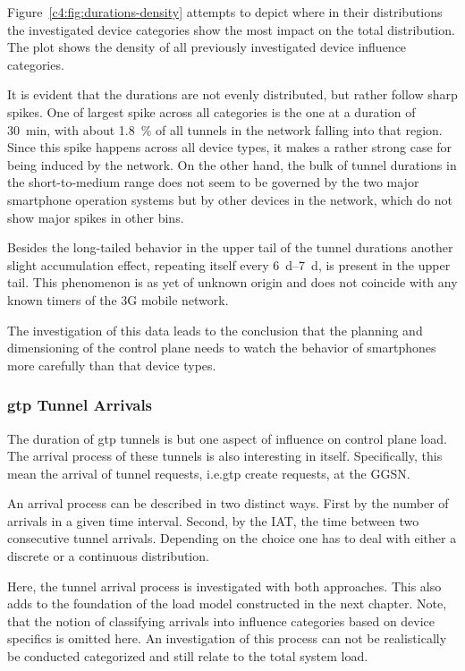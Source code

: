 Figure~\ref{c4:fig:durations-density} attempts to depict where in their distributions the investigated device categories show the most impact on the total distribution. The plot shows the density of all previously investigated device influence categories.

It is evident that the durations are not evenly distributed, but rather follow sharp spikes. One of largest spike across all categories is the one at a duration of \SI{30}{\minute}, with about \SI{1.8}{\percent} of all tunnels in the network falling into that region. Since this spike happens across all device types, it makes a rather strong case for being induced by the network. On the other hand, the bulk of tunnel durations in the short-to-medium range does not seem to be governed by the two major smartphone operation systems but by other devices in the network, which do not show major spikes in other bins.

Besides the long-tailed behavior in the upper tail of the tunnel durations another slight accumulation effect, repeating itself every \SIrange{6}{7}{\day}, is present in the upper tail. This phenomenon is as yet of unknown origin and does not coincide with any known timers of the \gls{3G} mobile network.

The investigation of this data leads to the conclusion that the planning and dimensioning of the control plane needs to watch the behavior of smartphones more carefully than that device types.


\subsubsection{\texorpdfstring{\acrshort{gtp}}{GTP} Tunnel Arrivals}

The duration of \gls{gtp} tunnels is but one aspect of influence on control plane load. The arrival process of these tunnels is also interesting in itself. Specifically, this mean the arrival of tunnel requests, i.e.\gls{gtp} create requests, at the \gls{GGSN}. 

An arrival process can be described in two distinct ways. First by the number of arrivals in a given time interval. Second, by the \gls{IAT}, the time between two consecutive tunnel arrivals. Depending on the choice one has to deal with either a discrete or a continuous distribution.

Here, the tunnel arrival process is investigated with both approaches. This also adds to the foundation of the load model constructed in the next chapter. Note, that the notion of classifying arrivals into influence categories based on device specifics is omitted here. An investigation of this process can not be realistically be conducted categorized and still relate to the total system load.

